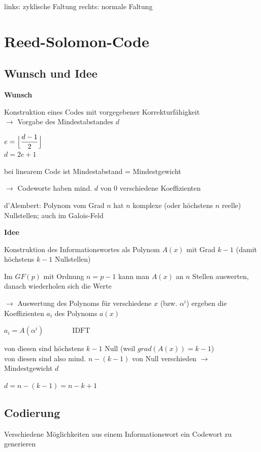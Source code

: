 links: zyklische Faltung \;\;\;\;\;\;\;\;\;\;\;\; rechts: normale Faltung

\section{Reed-Solomon-Code}

\subsection{Wunsch und Idee}

\textbf{Wunsch}

Konstruktion eines Codes mit vorgegebener Korrekturfähigkeit\\
$\rightarrow$ Vorgabe des Mindestabstandes $d$

$\displaystyle{
    e = \Bigl\lfloor \frac{d - 1}{2} \Bigr\rfloor
}$\\
$\displaystyle{
    d = 2e + 1
}$

bei linearem Code ist Mindestabstand = Mindestgewicht

$\rightarrow$ Codeworte haben mind. $d$ von 0 verschiedene Koeffizienten

d'Alembert: Polynom vom Grad $n$ hat $n$ komplexe (oder höchstens $n$ reelle) Nullstellen; auch
im Galois-Feld

\textbf{Idee}

Konstruktion des Informationswortes als Polynom $A(x)$ mit Grad $k-1$ (damit höchstens $k-1$ Nullstellen)

Im $GF(p)$ mit Ordnung $n = p-1$ kann man $A(x)$ an $n$ Stellen auswerten, danach wiederholen sich die Werte

$\rightarrow$ Auswertung des Polynoms für verschiedene $x$ (bzw. $\alpha^i$) ergeben die Koeffizienten $a_i$ des
Polynoms $a(x)$

$\displaystyle{
    a_i = A(\alpha^i) \qquad\qquad \text{IDFT}
}$

von diesen sind höchstens $k-1$ Null (weil $grad(A(x)) = k-1$)\\
von diesen sind also mind. $n - (k-1)$ von Null verschieden $\rightarrow$ Mindestgewicht $d$

$d = n - (k - 1) = n - k + 1$

\subsection{Codierung}

Verschiedene Möglichkeiten aus einem Informationswort ein Codewort zu generieren

